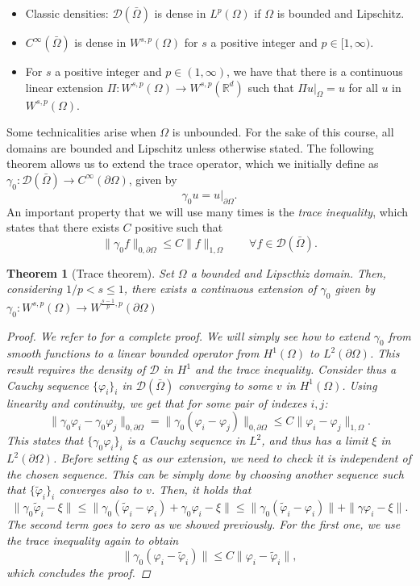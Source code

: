 \documentclass{article}
\newcommand{\R}{\mathbb{R}}
\newcommand{\D}{\mathcal{D}}
\newtheorem{theorem}{Theorem}
\begin{document}
\begin{itemize}
    \item Classic densities: $\D(\bar\Omega)$ is dense in $L^p(\Omega)$ if $\Omega$ is bounded and Lipschitz.
    \item $C^\infty(\bar\Omega)$ is dense in $W^{s,p}(\Omega)$ for $s$ a positive integer and $p\in [1,\infty)$.
    \item For $s$ a positive integer and $p\in (1,\infty)$, we have that there is a continuous linear extension $\Pi: W^{s,p}(\Omega) \to W^{s,p}(\R^d)$ such that $\Pi u|_\Omega = u$ for all $u$ in $W^{s,p}(\Omega)$.
\end{itemize}

Some technicalities arise when $\Omega$ is unbounded. For the sake of this course, all domains are bounded and Lipschitz unless otherwise stated. The following theorem allows us to extend the trace operator, which we initially define as $\gamma_0: \D(\bar\Omega) \to C^\infty(\partial\Omega)$, given by
    $$ \gamma_0 u = u|_{\partial\Omega}.$$
An important property that we will use many times is the \emph{trace inequality}, which states that there exists $C$ positive such that 
    $$ \| \gamma_0 f \|_{0,\partial\Omega} \leq C \| f \|_{1,\Omega} \qquad\forall f \in \mathcal D(\bar\Omega). $$

\begin{theorem}[Trace theorem]\label{thm:trace-theorem}
    Set $\Omega$ a bounded and Lipscthiz domain. Then, considering $1/p < s \leq 1$, there exists a continuous extension of $\gamma_0$ given by $\gamma_0: W^{s,p}(\Omega) \to W^{\frac{s-1}{p}, p}(\partial\Omega)$
    \begin{proof}
        We refer to \cite{adams2003sobolev} for a complete proof. We will simply see how to extend $\gamma_0$ from smooth functions to a linear bounded operator from $H^1(\Omega)$ to $L^2(\partial\Omega)$. This result requires the density of $\mathcal D$ in $H^1$ and the trace inequality. Consider thus a Cauchy sequence $\{\varphi_i\}_i$ in $\mathcal D(\bar\Omega)$ converging to some $v$ in $H^1(\Omega)$. Using linearity and continuity, we get that for some pair of indexes $i,j$: 
        $$ \| \gamma_0 \varphi_i - \gamma_0 \varphi_j \|_{0,\partial\Omega} = \| \gamma_0 (\varphi_i - \varphi_j) \|_{0,\partial\Omega} \leq C \| \varphi_i - \varphi_j \|_{1,\Omega}. $$
        This states that $\{ \gamma_0 \varphi_i \}_i $ is a Cauchy sequence in $L^2$, and thus has a limit $\xi$ in $L^2(\partial\Omega)$. Before setting $\xi$ as our extension, we need to check it is independent of the chosen sequence. This can be simply done by choosing another sequence such that $\{\tilde \varphi_i\}_i$ converges also to $v$. Then, it holds that 
        $$ \| \gamma_0 \tilde \varphi_i - \xi \| \leq \| \gamma_0(\tilde\varphi_i - \varphi_i) + \gamma_0 \varphi_i - \xi \| \leq \| \gamma_0(\tilde\varphi_i - \varphi_i) \| + \| \gamma\varphi_i - \xi \|. $$
        The second term goes to zero as we showed previously. For the first one, we use the trace inequality again to obtain 
        $$ \| \gamma_0(\varphi_i - \tilde\varphi_i) \| \leq C \|\varphi_i - \tilde \varphi_i \|, $$
        which concludes the proof. 
    \end{proof}
\end{theorem}
\end{document}

